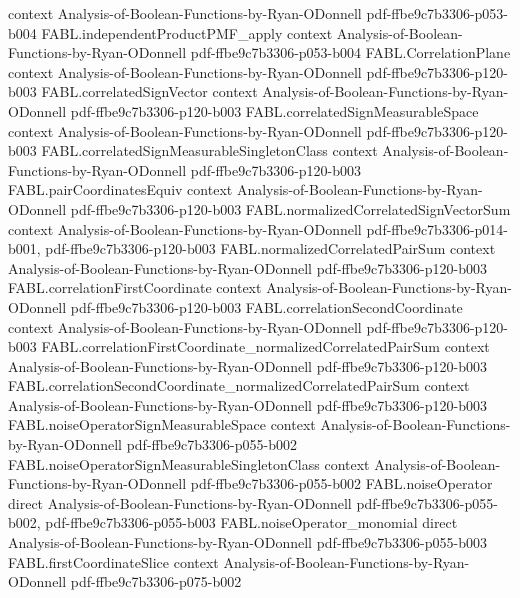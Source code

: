 \begin{theorem}
  {context}
  {Analysis-of-Boolean-Functions-by-Ryan-ODonnell}
  {pdf-ffbe9c7b3306-p053-b004}
\proofstep
  {FABL.independentProductPMF_apply}
  {context}
  {Analysis-of-Boolean-Functions-by-Ryan-ODonnell}
  {pdf-ffbe9c7b3306-p053-b004}
\proofstep
  {FABL.CorrelationPlane}
  {context}
  {Analysis-of-Boolean-Functions-by-Ryan-ODonnell}
  {pdf-ffbe9c7b3306-p120-b003}
\proofstep
  {FABL.correlatedSignVector}
  {context}
  {Analysis-of-Boolean-Functions-by-Ryan-ODonnell}
  {pdf-ffbe9c7b3306-p120-b003}
\proofstep
  {FABL.correlatedSignMeasurableSpace}
  {context}
  {Analysis-of-Boolean-Functions-by-Ryan-ODonnell}
  {pdf-ffbe9c7b3306-p120-b003}
\proofstep
  {FABL.correlatedSignMeasurableSingletonClass}
  {context}
  {Analysis-of-Boolean-Functions-by-Ryan-ODonnell}
  {pdf-ffbe9c7b3306-p120-b003}
\proofstep
  {FABL.pairCoordinatesEquiv}
  {context}
  {Analysis-of-Boolean-Functions-by-Ryan-ODonnell}
  {pdf-ffbe9c7b3306-p120-b003}
\proofstep
  {FABL.normalizedCorrelatedSignVectorSum}
  {context}
  {Analysis-of-Boolean-Functions-by-Ryan-ODonnell}
  {pdf-ffbe9c7b3306-p014-b001,
    pdf-ffbe9c7b3306-p120-b003}
\proofstep
  {FABL.normalizedCorrelatedPairSum}
  {context}
  {Analysis-of-Boolean-Functions-by-Ryan-ODonnell}
  {pdf-ffbe9c7b3306-p120-b003}
\proofstep
  {FABL.correlationFirstCoordinate}
  {context}
  {Analysis-of-Boolean-Functions-by-Ryan-ODonnell}
  {pdf-ffbe9c7b3306-p120-b003}
\proofstep
  {FABL.correlationSecondCoordinate}
  {context}
  {Analysis-of-Boolean-Functions-by-Ryan-ODonnell}
  {pdf-ffbe9c7b3306-p120-b003}
\proofstep
  {FABL.correlationFirstCoordinate_normalizedCorrelatedPairSum}
  {context}
  {Analysis-of-Boolean-Functions-by-Ryan-ODonnell}
  {pdf-ffbe9c7b3306-p120-b003}
\proofstep
  {FABL.correlationSecondCoordinate_normalizedCorrelatedPairSum}
  {context}
  {Analysis-of-Boolean-Functions-by-Ryan-ODonnell}
  {pdf-ffbe9c7b3306-p120-b003}
\proofstep
  {FABL.noiseOperatorSignMeasurableSpace}
  {context}
  {Analysis-of-Boolean-Functions-by-Ryan-ODonnell}
  {pdf-ffbe9c7b3306-p055-b002}
\proofstep
  {FABL.noiseOperatorSignMeasurableSingletonClass}
  {context}
  {Analysis-of-Boolean-Functions-by-Ryan-ODonnell}
  {pdf-ffbe9c7b3306-p055-b002}
\proofstep
  {FABL.noiseOperator}
  {direct}
  {Analysis-of-Boolean-Functions-by-Ryan-ODonnell}
  {pdf-ffbe9c7b3306-p055-b002,
    pdf-ffbe9c7b3306-p055-b003}
\proofstep
  {FABL.noiseOperator_monomial}
  {direct}
  {Analysis-of-Boolean-Functions-by-Ryan-ODonnell}
  {pdf-ffbe9c7b3306-p055-b003}
\proofstep
  {FABL.firstCoordinateSlice}
  {context}
  {Analysis-of-Boolean-Functions-by-Ryan-ODonnell}
  {pdf-ffbe9c7b3306-p075-b002}

\end{theorem}
